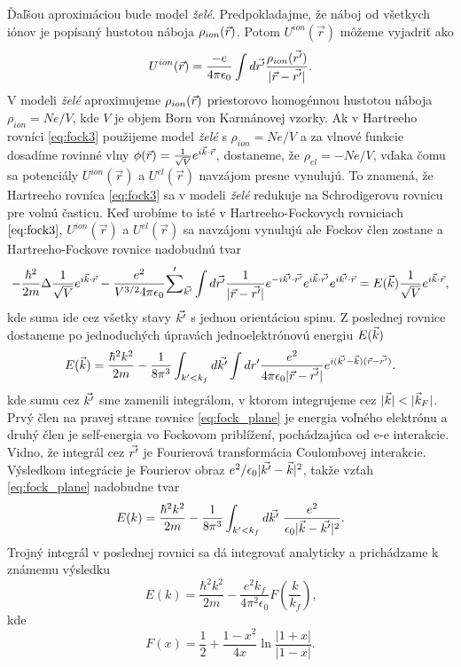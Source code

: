 Ďaľšou aproximáciou bude model \emph{želé}. Predpokladajme,
 že náboj od všetkych iónov je popísaný hustotou náboja $\rho_{ion}(\vec{r})$. Potom $U^{ion}(\vec{r})$ môžeme vyjadriť ako
\begin{equation}
\label{eq:ion_pudding}
U^{ion}(\vec{r}) = \frac{-e}{4\pi \epsilon_0}\int d\vec{r'} \frac{\rho_{ion}(\vec{r'})}{|\vec{r}-\vec{r'}|} \text{.}
\end{equation}
V modeli \emph{želé} aproximujeme $\rho_{ion}(\vec{r})$ priestorovo homogénnou hustotou náboja $\rho_{ion}=Ne/V$, kde $V$ je objem Born von Karmánovej vzorky.
Ak v Hartreeho rovníci \eqref{eq:fock3} použijeme model \emph{želé} s $\rho_{ion}=Ne/V$ a za vlnové funkcie dosadíme rovinné vlny $\phi(\vec{r})=\frac{1}{\sqrt{V}}e^{i\vec{k}\cdot\vec{r}}$,
dostaneme, že $\rho_{el}=-Ne/V$, vďaka čomu sa potenciály $U^{ion}(\vec{r})$ a $U^{el}(\vec{r})$ navzájom presne vynulujú.
To znamená, že Hartreeho rovníca \eqref{eq:fock3} sa v modeli \emph{želé} redukuje na Schrodigerovu rovnicu pre volnú časticu.
Keď urobíme to isté v Hartreeho-Fockovych rovniciach $\eqref{eq:fock3}$, $U^{ion}(\vec{r})$ a $U^{el}(\vec{r})$ sa navzájom vynulujú
ale Fockov člen zostane a Hartreeho-Fockove rovnice nadobudnú tvar
\begin{equation}
\label{eq:fock_final}
-\frac{\hbar^2}{2m}\Delta \frac{1}{\sqrt V}e^{i\vec{k}\cdot\vec{r}}-\frac{e^2}{V^{3/2}4\pi\epsilon_0}{\sum'}_{\vec{k'}}\int d\vec{r'} \frac{1}{|\vec{r}-\vec{r'}|} e^{-i\vec{k'} \cdot \vec{r'} }e^{i\vec{k} \cdot \vec{r'}}e^{i\vec{k'} \cdot \vec{r}}=E(\vec{k})\frac{1}{\sqrt V}e^{i\vec{k} \cdot \vec{r}} \text{,}
\end{equation}
kde suma ide cez všetky stavy $\vec{k'}$ s jednou orientáciou spinu. Z poslednej rovnice dostaneme po jednoduchých úpravách
jednoelektrónovú energiu $E(\vec{k})$
\begin{equation}
\label{eq:fock_plane}
E(\vec{k})=\frac{\hbar^2 k^2}{2m}- \frac{1}{8\pi^3} \int_{k'<k_f} d \vec{k'}\int dr'\frac{e^2}{4\pi\epsilon_0|\vec{r}-\vec{r'}|} e^{i(\vec{k'}-\vec{k})(\vec{r}-\vec{r'})} \text{.}
\end{equation}
kde sumu cez $\vec{k'}$ sme zamenili integrálom, v ktorom integrujeme cez $|\vk|<|\vk_F|$. Prvý člen
na pravej strane rovnice \eqref{eq:fock_plane} je energia voľného elektrónu a druhý člen je self-energia vo Fockovom priblížení,
pochádzajúca od e-e interakcie.
Vidno, že integrál cez $\vec{r'}$ je Fourierová transformácia Coulombovej interakcie. Výsledkom integrácie je Fourierov obraz $e^2/\epsilon_0|\vec{k'}-\vec{k}|^2$, takže vzťah
\eqref{eq:fock_plane} nadobudne tvar
\begin{equation}
\label{eq:fock_plane2}
E(k)=\frac{\hbar^2 k^2}{2m}-\frac{1}{8\pi^3}  \int_{k'<k_f} d\vkp \ \frac{e^2}{\epsilon_0|\vk-\vkp|^2}\text{.}
\end{equation}
Trojný integrál v poslednej rovnici sa dá integrovať analyticky a prichádzame k známemu výsledku \cite{Mermin}
\begin{equation}
\label{eq:fock_erg}
E(k)=\frac{\hbar^2 k^2}{2m}- \frac{e^2 k_f}{4\pi^2\epsilon_0} F(\frac{k}{k_f}) \text{,}
\end{equation}
kde
\begin{equation}
\label{eq:fock_fx}
F(x)=\frac{1}{2}+\frac{1-x^2}{4x}\ln{\frac{|1+x|}{|1-x|}} \text{.}
\end{equation}

